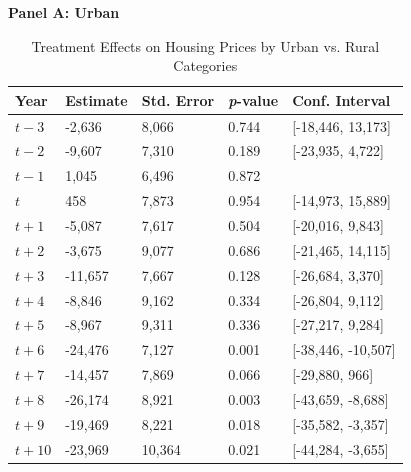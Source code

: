 \begin{table}[htbp]
\begin{threeparttable}
\begin{minipage}{\linewidth}
\begin{tablenotes}[flushleft]
    \end{tablenotes}
    \end{minipage}
    \end{threeparttable}
\end{table}


\begin{table}[htbp]
    \centering
    \caption{Treatment Effects on Housing Prices by Urban vs. Rural Categories}
    \label{tab:urban_rural_results}
    \begin{threeparttable}
    \small
    \textbf{Panel A: Urban} \\[4pt]
    \begin{tabularx}{\textwidth}{l*{4}{X}}
    \hline
    \textbf{Year} & \textbf{Estimate} & \textbf{Std. Error} & \textbf{\textit{p}-value} & \textbf{Conf. Interval} \\
    \hline
    $t - 3$  & -2,636  & 8,066  & 0.744 & [-18,446, 13,173] \\
    $t - 2$  & -9,607  & 7,310  & 0.189 & [-23,935, 4,722] \\
    $t - 1$  & 1,045   & 6,496  & 0.872 &  \\
    $t$  & 458     & 7,873  & 0.954 & [-14,973, 15,889] \\
    $t + 1$  & -5,087  & 7,617  & 0.504 & [-20,016, 9,843] \\
    $t + 2$  & -3,675  & 9,077  & 0.686 & [-21,465, 14,115] \\
    $t + 3$  & -11,657 & 7,667  & 0.128 & [-26,684, 3,370] \\
    $t + 4$  & -8,846  & 9,162  & 0.334 & [-26,804, 9,112] \\
    $t + 5$  & -8,967  & 9,311  & 0.336 & [-27,217, 9,284] \\
    $t + 6$  & -24,476 & 7,127  & 0.001 & [-38,446, -10,507] \\
    $t + 7$  & -14,457 & 7,869  & 0.066 & [-29,880, 966] \\
    $t + 8$  & -26,174 & 8,921  & 0.003 & [-43,659, -8,688] \\
    $t + 9$  & -19,469 & 8,221  & 0.018 & [-35,582, -3,357] \\
    $t + 10$ & -23,969 & 10,364 & 0.021 & [-44,284, -3,655] \\
    \hline
    \end{tabularx}
    
    \vspace{8pt}
    

\end{threeparttable}
\end{table}
